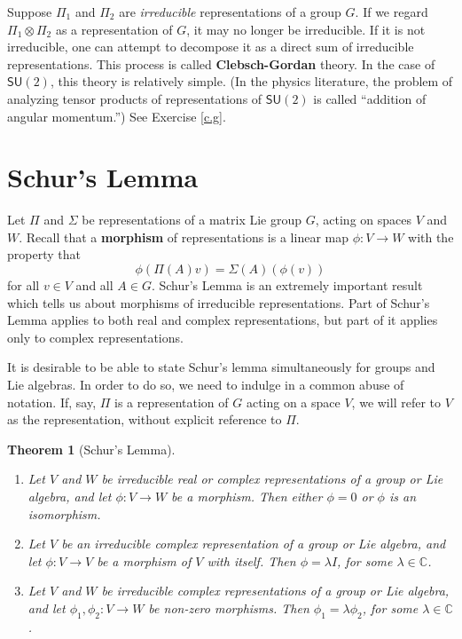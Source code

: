\documentclass[12pt]{amsbook}
\theoremstyle{plain}
\newtheorem{theorem}{Theorem}
\numberwithin{equation}{chapter}
\numberwithin{theorem}{chapter}
\begin{document}
Suppose $\Pi_{1}$ and $\Pi_{2}$ are \textit{irreducible} representations of a
group $G$. If we regard $\Pi_{1}\otimes\Pi_{2}$ as a representation of $G$, it
may no longer be irreducible. If it is not irreducible, one can attempt to
decompose it as a direct sum of irreducible representations. This process is
called \textbf{Clebsch-Gordan} theory. In the case of $\mathsf{SU}(2)$, this
theory is relatively simple. (In the physics literature, the problem of
analyzing tensor products of representations of $\mathsf{SU}(2)$ is called
``addition of angular momentum.'') See Exercise \ref{c.g}.

\section{Schur's Lemma}

Let $\Pi$ and $\Sigma$ be representations of a matrix Lie group $G$, acting on
spaces $V$ and $W$. Recall that a \textbf{morphism} of representations is a
linear map $\phi:V\rightarrow W$ with the property that
\[
\phi\left(  \Pi(A)v\right)  =\Sigma(A)\left(  \phi(v)\right)
\]
for all $v\in V$ and all $A\in G$. Schur's Lemma is an extremely important
result which tells us about morphisms of irreducible representations. Part of
Schur's Lemma applies to both real and complex representations, but part of it
applies only to complex representations.

It is desirable to be able to state Schur's lemma simultaneously for groups
and Lie algebras. In order to do so, we need to indulge in a common abuse of
notation. If, say, $\Pi$ is a representation of $G$ acting on a space $V$, we
will refer to $V$ as the representation, without explicit reference to $\Pi$.

\begin{theorem}
[Schur's Lemma]%
\begin{enumerate}
\item \label{schur1}Let $V$ and $W$ be \textit{irreducible} real or complex
representations of a group or Lie algebra, and let $\phi:V\rightarrow W$ be a
morphism. Then either $\phi=0$ or $\phi$ is an isomorphism.

\item \label{schur2}Let $V$ be an irreducible \textit{complex} representation
of a group or Lie algebra, and let $\phi:V\rightarrow V$ be a morphism of $V$
with itself. Then $\phi=\lambda I$, for some $\lambda\in\mathbb{C}$.

\item \label{schur3}Let $V$ and $W$ be irreducible complex representations of
a group or Lie algebra, and let $\phi_{1},\phi_{2}:V\rightarrow W$ be non-zero
morphisms. Then $\phi_{1}=\lambda\phi_{2}$, for some $\lambda\in\mathbb{C}$.
\end{enumerate}
\end{theorem}
\end{document}
